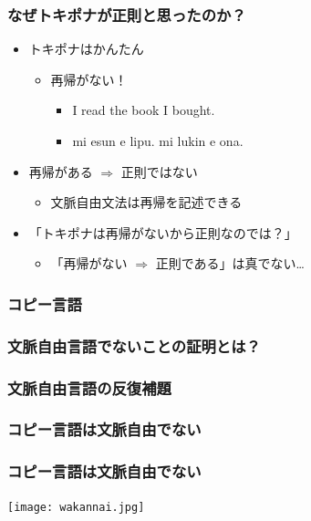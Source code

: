 \documentclass[14pt]{beamer}
\theoremstyle{definition}
\begin{document}
\begin{frame}
	\frametitle{なぜトキポナが正則と思ったのか？}

	\begin{itemize}
		\item トキポナはかんたん
			\begin{itemize}
				\item 再帰がない！
					\begin{itemize}
						\item I read the book I bought.
						\item mi esun e lipu. mi lukin e ona.
					\end{itemize}
			\end{itemize}
		\item 再帰がある $\Rightarrow$ 正則ではない
			\begin{itemize}
				\item 文脈自由文法は再帰を記述できる
			\end{itemize}
		\item 「トキポナは再帰がないから正則なのでは？」
			\begin{itemize}
				\item {\color{gray} \small「再帰がない $\Rightarrow$ 正則である」は真でない…}
			\end{itemize}
	\end{itemize}

\end{frame}


\begin{frame}
	\frametitle{コピー言語}
\end{frame}


\begin{frame}
	\frametitle{文脈自由言語でないことの証明とは？}
\end{frame}


\begin{frame}
	\frametitle{文脈自由言語の反復補題}
\end{frame}


\begin{frame}
	\frametitle{コピー言語は文脈自由でない}
\end{frame}


\begin{frame}
	\frametitle{コピー言語は文脈自由でない}

	\begin{center}
		\texttt{[image: wakannai.jpg]}
	\end{center}
\end{frame}
\end{document}
